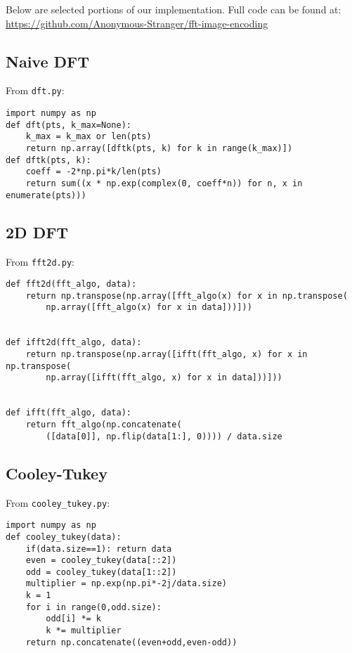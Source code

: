 \lstset{language=Python,basicstyle=\footnotesize\ttfamily}

Below are selected portions of our implementation. Full code can be found at: \\ \href{https://github.com/Anonymous-Stranger/fft-image-encoding}{https://github.com/Anonymous-Stranger/fft-image-encoding}

\subsection{Naive DFT}
	\label{code:naive_dft_python}
	From \verb|dft.py|:
	\begin{lstlisting}
import numpy as np
def dft(pts, k_max=None):
    k_max = k_max or len(pts)
    return np.array([dftk(pts, k) for k in range(k_max)])
def dftk(pts, k):
    coeff = -2*np.pi*k/len(pts)
    return sum((x * np.exp(complex(0, coeff*n)) for n, x in enumerate(pts)))
	\end{lstlisting}

\subsection{2D DFT}
	\label{code:2d-dft}
	From \verb|fft2d.py|:
	\begin{lstlisting}
def fft2d(fft_algo, data):
    return np.transpose(np.array([fft_algo(x) for x in np.transpose(
        np.array([fft_algo(x) for x in data]))]))


def ifft2d(fft_algo, data):
    return np.transpose(np.array([ifft(fft_algo, x) for x in np.transpose(
        np.array([ifft(fft_algo, x) for x in data]))]))


def ifft(fft_algo, data):
    return fft_algo(np.concatenate(
        ([data[0]], np.flip(data[1:], 0)))) / data.size
	\end{lstlisting}

\subsection{Cooley-Tukey}
	\label{code:cooley_tukey_python}
	From \verb|cooley_tukey.py|:
	\begin{lstlisting}
import numpy as np
def cooley_tukey(data):
    if(data.size==1): return data
    even = cooley_tukey(data[::2])
    odd = cooley_tukey(data[1::2])
    multiplier = np.exp(np.pi*-2j/data.size)
    k = 1
    for i in range(0,odd.size):
        odd[i] *= k
        k *= multiplier
    return np.concatenate((even+odd,even-odd))
	\end{lstlisting}


